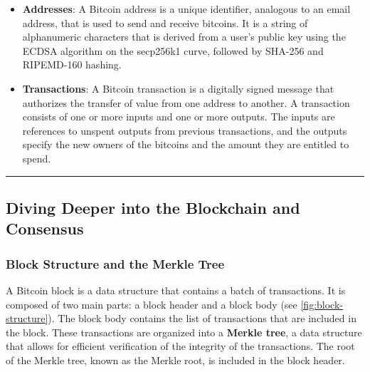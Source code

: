 \begin{itemize}
	\tightlist
	\item
	\textbf{Addresses}: A Bitcoin address is a unique identifier,
	analogous to an email address, that is used to send and receive
	bitcoins. It is a string of alphanumeric characters that is derived
	from a user's public key using the ECDSA algorithm on the secp256k1
	curve, followed by SHA-256 and RIPEMD-160 hashing.
	\item
	\textbf{Transactions}: A Bitcoin transaction is a digitally signed
	message that authorizes the transfer of value from one address to
	another. A transaction consists of one or more inputs and one or more
	outputs. The inputs are references to unspent outputs from previous
	transactions, and the outputs specify the new owners of the bitcoins
	and the amount they are entitled to spend.
\end{itemize}

\begin{center}\rule{0.5\linewidth}{0.5pt}\end{center}

\subsection{Diving Deeper into the Blockchain and Consensus}\label{section-3-diving-deeper-into-the-blockchain}

\subsubsection{Block Structure and the Merkle
	Tree}\label{block-structure-and-the-merkle-tree}

A Bitcoin block is a data structure that contains a batch of
transactions. It is composed of two main parts: a block header and a
block body (see \autoref{fig:block-structure}). The block body contains the list of transactions that are
included in the block. These transactions are organized into a
\textbf{Merkle tree}, a data structure that allows for efficient
verification of the integrity of the transactions. The root of the
Merkle tree, known as the Merkle root, is included in the block header.

